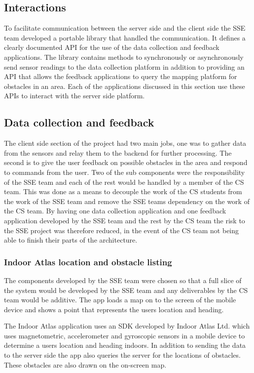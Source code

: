 \documentclass[prodmode,acmtosem]{acmsmall} %
\begin{document}
\subsection{Interactions}
\label{sec:interactions}
To facilitate communication between the server side and the client side the SSE team developed a portable library that handled the communication. It defines a clearly documented API for the use of the data collection and feedback applications. The library contains methods to synchronously or asynchronously send sensor readings to the data collection platform in addition to providing an API that allows the feedback applications to query the mapping platform for obstacles in an area. Each of the applications discussed in this section use these APIs to interact with the server side platform.

\subsection{Data collection and feedback}
The client side section of the project had two main jobs, one was to gather data from the sensors and relay them to the backend for further processing. The second is to give the user feedback on possible obstacles in the area and respond to commands from the user. Two of the sub components were the responsibility of the SSE team and each of the rest would be handled by a member of the CS team. This was done as a means to decouple the work of the CS students from the work of the SSE team and remove the SSE teams dependency on the work of the CS team. By having one data collection application and one feedback application developed by the SSE team and the rest by the CS team the risk to the SSE project was therefore reduced, in the event of the CS team not being able to finish their parts of the architecture.

\subsubsection{Indoor Atlas location and obstacle listing}
The components developed by the SSE team were chosen so that a full slice of the system would be developed by the SSE team and any deliverables by the CS team would be additive. The app loads a map on to the screen of the mobile device and shows a point that represents the users location and heading.

The Indoor Atlas application uses an SDK developed by Indoor Atlas Ltd. \cite{IndoorAtlas} which uses magnetometric, accelerometer and gyroscopic sensors in a mobile device to determine a users location and heading indoors. In addition to sending the data to the server side the app also queries the server for the locations of obstacles. These obstacles are also drawn on the on-screen map.
\end{document}
